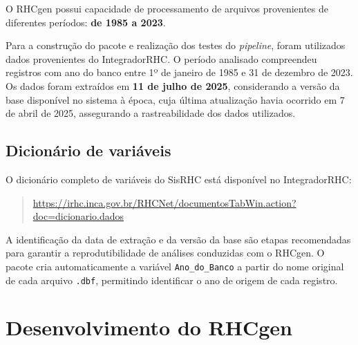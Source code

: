 \documentclass[
  brazilian,
  a4paper,
  oneside]{scrbook}
\begin{document}
O RHCgen possui capacidade de processamento de arquivos provenientes de
diferentes períodos: \textbf{de 1985 a 2023}.

Para a construção do pacote e realização dos testes do \emph{pipeline},
foram utilizados dados provenientes do IntegradorRHC. O período
analisado compreendeu registros com ano do banco entre 1º de janeiro de
1985 e 31 de dezembro de 2023. Os dados foram extraídos em \textbf{11 de
julho de 2025}, considerando a versão da base disponível no sistema à
época, cuja última atualização havia ocorrido em 7 de abril de 2025,
assegurando a rastreabilidade dos dados utilizados.

\section{Dicionário de variáveis}\label{dicionuxe1rio-de-variuxe1veis}

O dicionário completo de variáveis do SisRHC está disponível no
IntegradorRHC:

\begin{quote}
\url{https://irhc.inca.gov.br/RHCNet/documentosTabWin.action?doc=dicionario.dados}
\end{quote}

\begin{tcolorbox}[enhanced jigsaw, arc=.35mm, bottomrule=.15mm, bottomtitle=1mm, breakable, colback=white, colbacktitle=quarto-callout-note-color!10!white, colframe=quarto-callout-note-color-frame, coltitle=black, left=2mm, leftrule=.75mm, opacityback=0, opacitybacktitle=0.6, rightrule=.15mm, title=\textcolor{quarto-callout-note-color}{\faInfo}\hspace{0.5em}{Rastreabilidade dos dados}, titlerule=0mm, toprule=.15mm, toptitle=1mm]

A identificação da data de extração e da versão da base são etapas
recomendadas para garantir a reprodutibilidade de análises conduzidas
com o RHCgen. O pacote cria automaticamente a variável
\texttt{Ano\_do\_Banco} a partir do nome original de cada arquivo
\texttt{.dbf}, permitindo identificar o ano de origem de cada registro.

\end{tcolorbox}


\chapter{Desenvolvimento do RHCgen}\label{desenvolvimento-do-rhcgen}
\end{document}

